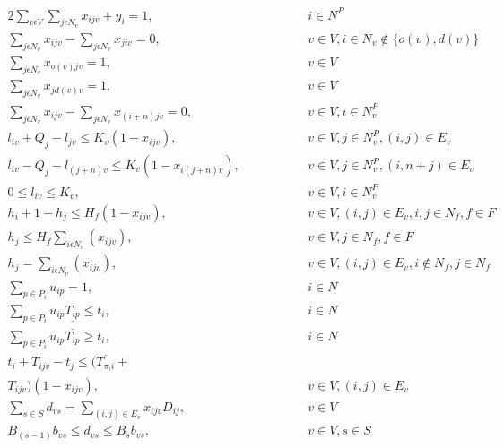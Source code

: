 \documentclass[a4paper,12pt]{article}
\begin{document}
\begingroup
    \allowdisplaybreaks
\begin{alignat} {2}
    \sum_{v\epsilon V}\sum_{j\epsilon N_v}x_{ijv} + y_i = 1,		&\quad\quad\quad	&& 	i \in N^P 						\label{eq:2} 	\\[4]
    \sum_{j\epsilon N_v}x_{ijv} - \sum_{j\epsilon N_v}x_{jiv} = 0,		& 			&&	v \in V, i\in N_v \notin \{o(v), d(v)\}		\label{eq:3} 	\\[4]
    \sum_{j\epsilon N_v}x_{o(v)jv} = 1,						& 			&&	v \in V 						\label{eq:4}	\\[4]
    \sum_{j\epsilon N_v}x_{j d(v)v} = 1,						& 			&&	v \in V 						\label{eq:5}	\\[4]
    \sum_{j\epsilon N_v}x_{ijv} - \sum_{j\epsilon N_v}x_{(i+n)jv} = 0,	& 			&&	v \in V, i\in N^P_v 					\label{eq:6}	\\[4]
    l_{iv} + Q_j - l_{jv} \leq K_v(1-x_{ijv}),					& 			&&	v \in V, j\in N_v^P, (i,j) \in E_v 			\label{eq:7} 	\\[8]
    l_{iv} - Q_j - l_{(j+n)v} \leq K_v(1-x_{i(j+n)v}),				& 			&&	v \in V ,j\in N_v^P, (i, n+j)\in E_v 		\label{eq:8}	\\[8]
    0 \leq l_{iv} \leq K_v,								& 			&&	v \in V, i \in N^P_v 					\label{eq:9}	\\[8]
    h_{i} + 1 - h_{j} \leq H_f(1-x_{ijv}),						& 			&&	v \in V, (i,j)\in E_v,  i, j \in N_f, f\in F 		\label{eq:10}\\[4]
    h_{j} \leq H_f\sum_{i\epsilon N_v}(x_{ijv}),					& 			&&	v \in V, j\in N_f, f\in F 				\label{eq:11}\\[4]
    h_{j} = \sum_{i\epsilon N_v}(x_{ijv}),					& 			&&	v \in V, (i, j)\in E_v, i \notin N_f, j \in N_f 	\label{eq:12}\\[4]
    \sum_{p\in P_i} u_{ip} = 1,							& 			&& 	i \in N 							\label{eq:13}\\[4]
    \sum_{p\in P_i} u_{ip}\underline{T_{ip}} \leq t_{i},			& 			&&	i \in N 							\label{eq:14}\\[4]
    \sum_{p\in P_i} u_{ip}\overline{T_{ip}} \geq t_{i},				& 			&& 	i \in N 							\label{eq:15}\\[4]
    t_{i} + T_{ijv} - t_{j} \leq (\overline{T_{\pi_i i}} + 				& 			&&						\nonumber\\
    T_{ijv})(1 - x_{ijv}),								& 			&& 	v \in V, (i,j) \in E_v					\label{eq:16}\\[8]
    \sum_{s \in S}d_{vs} = \sum_{(i,j) \in E_v} x_{ijv}D_{ij},			& 			&&	v \in V							\label{eq:17}\\[4]
    B_{(s-1)}b_{vs} \leq d_{vs} \leq B_sb_{vs},				& 			&&	v \in V, s \in S 					\label{eq:18}\\[4]

\end{alignat}
\end{document}
